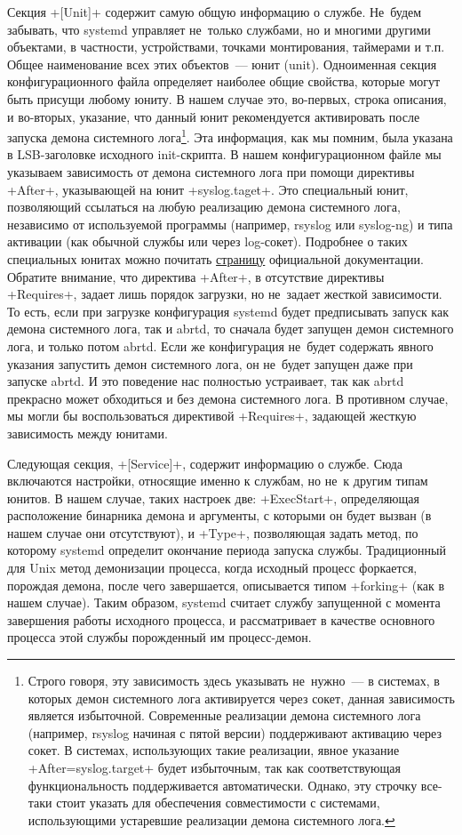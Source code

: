 \documentclass[10pt,oneside,a4paper]{article}
\begin{document}
Секция +[Unit]+ содержит самую общую информацию о службе. Не~будем
забывать, что systemd управляет не~только службами, но и многими другими
объектами, в частности, устройствами, точками монтирования, таймерами и т.п.
Общее наименование всех этих объектов~--- юнит (unit). Одноименная секция
конфигурационного файла определяет наиболее общие свойства, которые могут
быть присущи любому юниту. В нашем случае это, во-первых, строка описания, и
во-вторых, указание, что данный юнит рекомендуется активировать после запуска
демона системного лога\footnote{Строго говоря, эту зависимость здесь
указывать не~нужно~--- в системах, в которых демон системного лога активируется
через сокет, данная зависимость является избыточной. Современные реализации
демона системного лога (например, rsyslog начиная с пятой версии)
поддерживают активацию через сокет. В системах, использующих такие
реализации, явное указание +After=syslog.target+ будет избыточным, так
как соответствующая функциональность поддерживается автоматически. Однако,
эту строчку все-таки стоит указать для обеспечения совместимости с системами,
использующими устаревшие реализации демона системного лога.}. Эта информация,
как мы помним, была указана в LSB-заголовке исходного init-скрипта. В нашем
конфигурационном файле мы указываем зависимость от демона системного лога при
помощи директивы +After+, указывающей на юнит +syslog.taget+. Это
специальный юнит, позволяющий ссылаться на любую реализацию демона системного
лога, независимо от используемой программы (например, rsyslog или syslog-ng)
и типа активации (как обычной службы или через log-сокет). Подробнее о таких
специальных юнитах можно почитать
\href{http://0pointer.de/public/systemd-man/systemd.special.html}{страницу}
официальной документации. Обратите внимание, что директива +After+, в
отсутствие директивы +Requires+, задает лишь порядок загрузки, но
не~задает жесткой зависимости. То есть, если при загрузке конфигурация
systemd будет предписывать запуск как демона системного лога, так и abrtd, то
сначала будет запущен демон системного лога, и только потом abrtd. Если же
конфигурация не~будет содержать явного указания запустить демон системного
лога, он не~будет запущен даже при запуске abrtd. И это поведение нас
полностью устраивает, так как abrtd прекрасно может обходиться и без демона
системного лога. В противном случае, мы могли бы воспользоваться директивой
+Requires+, задающей жесткую зависимость между юнитами.

Следующая секция, +[Service]+, содержит информацию о службе. Сюда включаются
настройки, относящие именно к службам, но не~к другим типам юнитов. В нашем
случае, таких настроек две: +ExecStart+, определяющая расположение бинарника
демона и аргументы, с которыми он будет вызван (в нашем случае они
отсутствуют), и +Type+, позволяющая задать метод, по которому systemd определит
окончание периода запуска службы. Традиционный для Unix метод демонизации
процесса, когда исходный процесс форкается, порождая демона, после чего
завершается, описывается типом +forking+ (как в нашем случае). Таким образом,
systemd считает службу запущенной с момента завершения работы исходного
процесса, и рассматривает в качестве основного процесса этой службы
порожденный им процесс-демон.
\end{document}
